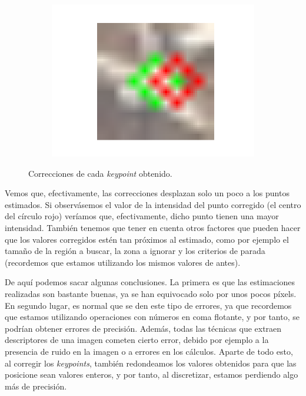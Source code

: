 \documentclass[11pt,a4paper]{article}
\begin{document}
\begin{figure}[H]
	\centering
	\begin{subfigure}[t]{.5\textwidth}
		\centering
		\includegraphics[scale=0.3]{img/kp-small3}
	\end{subfigure}
	\caption{Correcciones de cada \textit{keypoint} obtenido.}
\end{figure}

Vemos que, efectivamente, las correcciones desplazan solo un poco a los puntos
estimados. Si observásemos el valor de la intensidad del punto corregido (el centro del
círculo rojo) veríamos que, efectivamente, dicho punto tienen una mayor intensidad.
También tenemos que tener en cuenta otros factores que pueden hacer que los
valores corregidos estén tan próximos al estimado, como por ejemplo
el tamaño de la región a buscar, la zona a ignorar y los criterios
de parada (recordemos que estamos utilizando los mismos valores
de antes).

De aquí podemos sacar algunas conclusiones. La primera es que las estimaciones
realizadas son bastante buenas, ya se han equivocado solo por unos pocos píxels.
En segundo lugar, es normal que se den este tipo de errores, ya que recordemos
que estamos utilizando operaciones con números en coma flotante, y por tanto,
se podrían obtener errores de precisión. Además, todas las técnicas que extraen
descriptores de una imagen cometen cierto error, debido por ejemplo a la presencia
de ruido en la imagen o a errores en los cálculos. Aparte de todo esto, al corregir los \textit{keypoints},
también redondeamos los valores obtenidos para que las posicione sean valores
enteros, y por tanto, al discretizar, estamos perdiendo algo más de precisión.
\end{document}
